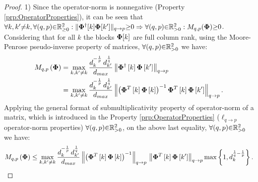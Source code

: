 \begin{proof}
1) Since the operator-norm is nonnegative (Property \ref{prp:OperatorProperties}), it can be seen that $\forall k , k' {\neq} k , \forall (q , p) {\in} \mathbb{R}^2_{{\geq} 0} : \Vert \boldsymbol{\Phi}^\dagger [k] \boldsymbol{\Phi} [k'] \Vert_{q \to p} {\geq} 0 \Rightarrow \forall (q , p) {\in} \mathbb{R}^2_{{>} 0} : M_{q,p}(\boldsymbol{\Phi}) {\geq} 0$.
Considering that for all $k$ the blocks $\boldsymbol{\Phi} [k]$ are full column rank, using the Moore-Penrose pseudo-inverse property of matrices, $\forall (q , p) {\in} \mathbb{R}^2_{{>} 0}$ we have:
\begin{gather*}
\begin{aligned}
M_{q,p}\left( \boldsymbol{\Phi} \right) &= \max_{k,k' \neq k} \frac{d_{k}^{-\frac1p} \, d_{k'}^{\frac1q}}{d_{max}} \left\lVert\boldsymbol{\Phi}^\dagger \left[ k \right] \boldsymbol{\Phi} \left[ k' \right]\right\rVert_{q \to p} \\
&= \max_{k,k' \neq k} \frac{d_{k}^{-\frac1p} \, d_{k'}^{\frac1q}}{d_{max}} \left\lVert\left( \boldsymbol{\Phi}^T \left[ k \right] \boldsymbol{\Phi}\left[ k \right] \right)^{-1}\boldsymbol{\Phi}^T \left[ k \right] \boldsymbol{\Phi} \left[ k' \right]\right\rVert_{q \to p}.
\end{aligned}
\end{gather*}
Applying the general format of submultiplicativity property of operator-norm of a matrix, which is introduced in the Property \ref{prp:OperatorProperties} ($\ell_{q {\to} p}$ operator-norm properties) $\forall (q , p) {\in} \mathbb{R}^2_{{>} 0}$, on the above last equality, $\forall (q , p) {\in} \mathbb{R}^2_{{>} 0}$ we have:
\begin{gather}
\label{eq:temp0}
\begin{aligned}
M_{q,p}\left( \boldsymbol{\Phi} \right) &\leq 
\max_{k,k' \neq k} \frac{d_{k}^{-\frac1p} \, d_{k'}^{\frac1q}}{d_{max}} 
\left\lVert\left( \boldsymbol{\Phi}^T \left[ k \right] \boldsymbol{\Phi} \left[ k \right] \right)^{-1}\right\rVert_{q \to p} \, \left\lVert\boldsymbol{\Phi}^T \left[ k \right] \boldsymbol{\Phi} \left[ k' \right]\right\rVert_{q \to p} \max \left\lbrace 1 , d_k^{\frac1q - \frac1p} \right\rbrace. \\
\end{aligned}
\end{gather}


\end{proof}
